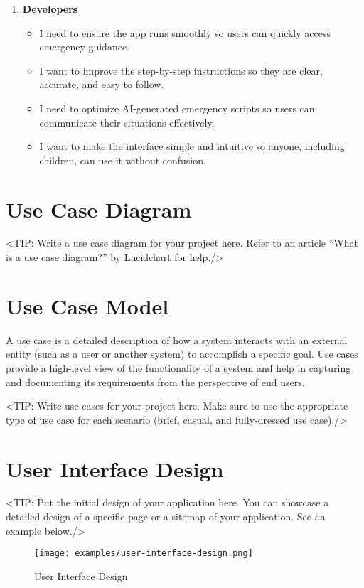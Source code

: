 \begin{enumerate}
    \item \textbf{Developers}
    \begin{itemize}
        \item I need to ensure the app runs smoothly so users can quickly access emergency guidance.
        \item I want to improve the step-by-step instructions so they are clear, accurate, and easy to follow.
        \item I need to optimize AI-generated emergency scripts so users can communicate their situations effectively.
        \item I want to make the interface simple and intuitive so anyone, including children, can use it without confusion.
    \end{itemize}
\end{enumerate}

\section{Use Case Diagram}
\label{section:use-case-diagram}
<TIP: Write a use case diagram for your project here. Refer to an
article “What is a use case diagram?” by Lucidchart for help./>

\section{Use Case Model}
\label{section:use-case-model}
A use case is a detailed description of how a system
interacts with an external entity (such as a user or another system) to
accomplish a specific goal. Use cases provide a high-level view of the
functionality of a system and help in capturing and documenting its
requirements from the perspective of end users.

<TIP: Write use cases for your project here. Make sure to use the
appropriate type of use case for each scenario (brief, casual, and fully-dressed
use case)./>

\section{User Interface Design}
\label{section:user-interface-design}
<TIP: Put the initial design of your application here. You can
showcase a detailed design of a specific page or a sitemap of your application.
See an example below./>

\begin{figure}[h]
    \centering
    \texttt{[image: examples/user-interface-design.png]}
    \caption{User Interface Design}
\end{figure}